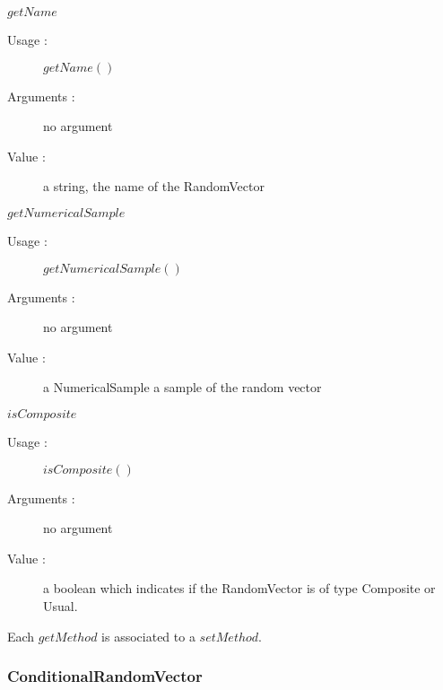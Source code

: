 \begin{description}
\begin{description}
  \item $getName$
    \begin{description}
    \item[Usage :] $getName()$
    \item[Arguments :] no argument
    \item[Value :] a string, the name of the RandomVector
    \end{description}
    \bigskip

  \item $getNumericalSample$
    \begin{description}
    \item[Usage :] $getNumericalSample()$
    \item[Arguments :] no argument
    \item[Value :] a NumericalSample
      a sample of the random vector
    \end{description}
    \bigskip

  \item $isComposite$
    \begin{description}
    \item[Usage :] $isComposite()$
    \item[Arguments :] no argument
    \item[Value :] a boolean which indicates if the RandomVector is of type Composite or Usual.
    \end{description}
  \end{description}

\end{description}

Each  $getMethod$  is associated to a $setMethod$.




\newpage \subsubsection{ConditionalRandomVector}

